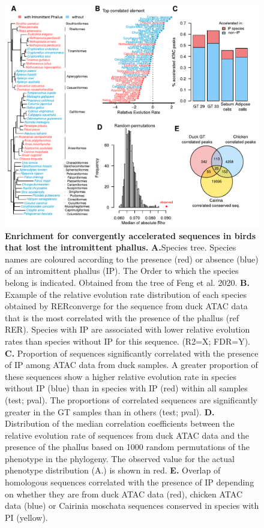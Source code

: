\begin{figure}[h]
    \centering
    \includegraphics[width=1\textwidth, page=1] {figures/IPLOSS/Fig_evol_peaks.pdf}
    \caption[Enrichment for convergently accelerated sequences in birds that lost the intromittent phallus.]{
    \textbf{Enrichment for convergently accelerated sequences in birds that lost the intromittent phallus.}
    \textbf{A.}Species tree. Species names are coloured according to the presence (red) or absence (blue) of an intromittent phallus (IP). The Order to which the species belong is indicated. Obtained from the tree of Feng et al. 2020. 
    \textbf{B.} Example of the relative evolution rate distribution of each species obtained by RERconverge for the sequence from duck ATAC data that is the most correlated with the presence of the phallus (ref RER). Species with IP are associated with lower relative evolution rates than species without IP for this sequence. (R2=X; FDR=Y). 
    \textbf{C.} Proportion of sequences significantly correlated with the presence of IP among ATAC data from duck samples. A greater proportion of these sequences show a higher relative evolution rate in species without IP (blue) than in species with IP (red) within all samples (test; pval). The proportions of correlated sequences are significantly greater in the GT samples than in others (test; pval). 
    \textbf{D.} Distribution of the median correlation coefficients between the relative evolution rate of sequences from duck ATAC data and the presence of the phallus based on 1000 random permutations of the phenotype in the phylogeny. The observed value for the actual phenotype distribution (A.) is shown in red. 
    \textbf{E.} Overlap of homologous sequences correlated with the presence of IP depending on whether they are from duck ATAC data (red), chicken ATAC data (blue) or Cairinia moschata sequences conserved in species with PI (yellow).    \\
    }
    \label{fig:IPLOSS-fig4}
\end{figure} 

